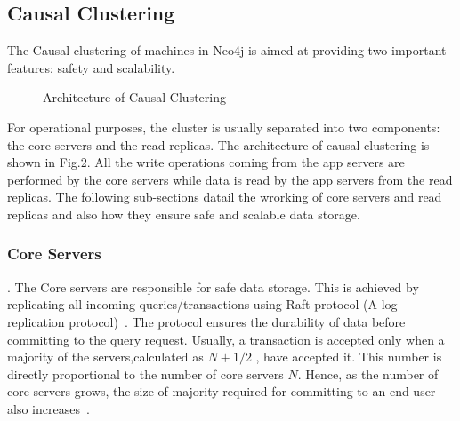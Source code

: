 \documentclass[9pt,twocolumn,twoside]{../../styles/osajnl}
\begin{document}
\subsection{Causal Clustering}
The Causal clustering of machines in Neo4j is aimed at providing two important features: safety and scalability. ~\cite{www-neo4j-causal}

\begin{figure}[htbp]
\centering
{}
\caption{Architecture of Causal Clustering ~\cite{www-neo4j-causal}}
\label{fig:false-color}
\end{figure}

 For operational purposes, the cluster is usually separated into two components: the core servers and the read replicas. The architecture of causal clustering is shown in Fig.2. All the write operations coming from the app servers are performed by the core servers while data is read by the app servers from the read replicas. The following sub-sections datail the wrorking of core servers and read replicas and also how they ensure safe and scalable data storage. 
\subsubsection{Core Servers}. 
The Core servers are responsible for safe data storage. This is achieved by replicating all incoming queries/transactions using Raft protocol (A log replication protocol)~\cite{www-neo4j-causal}. The protocol ensures the durability of data before committing to the query request. Usually, a transaction is accepted only when a majority of the servers,calculated as $N+1/2$ , have accepted it. This number is directly proportional to the number of core servers $N$. Hence, as the number of core servers grows, the size of majority required for committing to an end user also increases~\cite{www-neo4j-causal}. 
\end{document}
